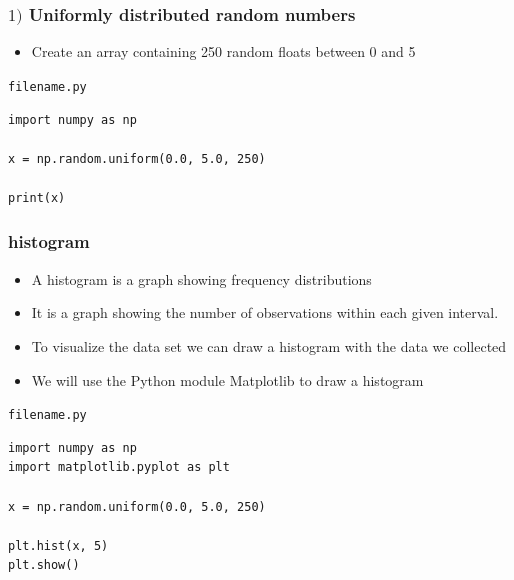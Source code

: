 \documentclass[english,14pt]{beamer}
\begin{document}
\begin{frame}[fragile]

\frametitle{$1)$ Uniformly distributed random numbers}


\begin{itemize}
	\item Create an array containing 250 random floats between 0 and 5
\end{itemize}


\texttt{filename.py}
\begin{lstlisting}[style=CStyle,basicstyle=\scriptsize]
import numpy as np

x = np.random.uniform(0.0, 5.0, 250)

print(x) 
\end{lstlisting}

\end{frame}


\begin{frame}[fragile]

\frametitle{histogram}



\begin{itemize}
	\item A histogram is a graph showing frequency distributions
	\item It is a graph showing the number of observations within each given interval.
	\item To visualize the data set we can draw a histogram with the data we collected
	\item We will use the Python module Matplotlib to draw a histogram
\end{itemize}

\texttt{filename.py}
\begin{lstlisting}[style=CStyle,basicstyle=\scriptsize]
import numpy as np
import matplotlib.pyplot as plt

x = np.random.uniform(0.0, 5.0, 250)

plt.hist(x, 5)
plt.show() 
\end{lstlisting}

\end{frame}
\end{document}
